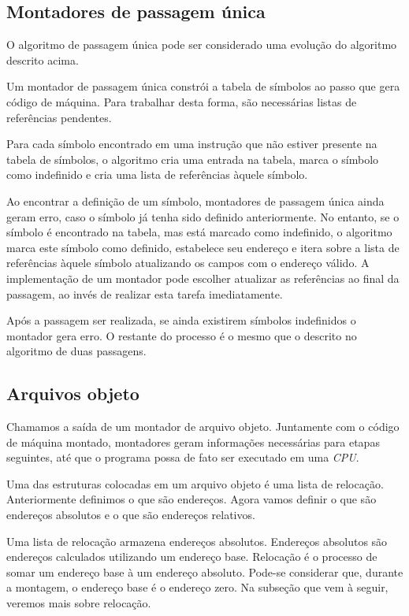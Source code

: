 \subsection{Montadores de passagem única}

O algoritmo de passagem única pode ser considerado uma evolução do algoritmo
descrito acima.

Um montador de passagem única constrói a tabela de símbolos ao passo que gera
código de máquina. Para trabalhar desta forma, são necessárias listas de
referências pendentes.

Para cada símbolo encontrado em uma instrução que não estiver presente na tabela
de símbolos, o algoritmo cria uma entrada na tabela, marca o símbolo como
indefinido e cria uma lista de referências àquele símbolo.

Ao encontrar a definição de um símbolo, montadores de passagem única ainda geram
erro, caso o símbolo já tenha sido definido anteriormente. No entanto, se o
símbolo é encontrado na tabela, mas está marcado como indefinido, o algoritmo
marca este símbolo como definido, estabelece seu endereço e itera sobre a lista
de referências àquele símbolo atualizando os campos com o endereço válido. A
implementação de um montador pode escolher atualizar as referências ao final da
passagem, ao invés de realizar esta tarefa imediatamente.

Após a passagem ser realizada, se ainda existirem símbolos indefinidos o
montador gera erro. O restante do processo é o mesmo que o descrito no algoritmo
de duas passagens.

\subsection{Arquivos objeto}

Chamamos a saída de um montador de arquivo objeto. Juntamente com o código de
máquina montado, montadores geram informações necessárias para etapas seguintes,
até que o programa possa de fato ser executado em uma \textit{CPU}.

Uma das estruturas colocadas em um arquivo objeto é uma lista de
relocação. Anteriormente definimos o que são endereços. Agora vamos definir o
que são endereços absolutos e o que são endereços relativos.

Uma lista de relocação armazena endereços absolutos. Endereços absolutos são
endereços calculados utilizando um endereço base. Relocação é o processo de
somar um endereço base à um endereço absoluto. Pode-se considerar que, durante a
montagem, o endereço base é o endereço zero. Na subseção que vem à seguir,
veremos mais sobre relocação.

